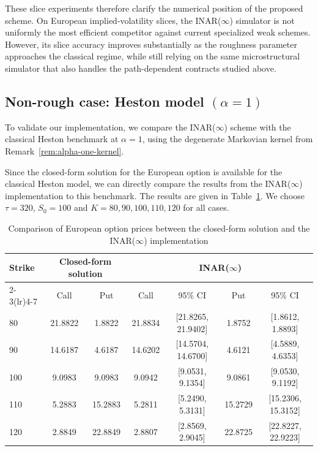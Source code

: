 \documentclass[letterpaper]{article}
\numberwithin{equation}{section}
\theoremstyle{definition}
\theoremstyle{remark}
\begin{document}
These slice experiments therefore clarify the numerical position of the proposed scheme. On European implied-volatility slices, the INAR($\infty$) simulator is not uniformly the most efficient competitor against current specialized weak schemes. However, its slice accuracy improves substantially as the roughness parameter approaches the classical regime, while still relying on the same microstructural simulator that also handles the path-dependent contracts studied above.


\subsection{Non-rough case: Heston model \texorpdfstring{$(\alpha=1)$}{(alpha=1)}}

To validate our implementation, we compare the INAR($\infty$) scheme with the classical Heston benchmark at $\alpha=1$, using the degenerate Markovian kernel from Remark~\ref{rem:alpha-one-kernel}.

Since the closed-form solution for the European option is available for the classical Heston model, we can directly compare the results from the INAR($\infty$) implementation to this benchmark. The results are given in Table~\ref{tab:european_comparison}. We choose $\tau=320$, $S_0=100$ and $K=80,90,100,110,120$ for all cases. 

\begin{table}[ht]
  \centering
  \caption{Comparison of European option prices between the closed-form solution and the INAR($\infty$) implementation}
  \small
  \setlength{\tabcolsep}{5pt}
  \begin{tabular*}{\textwidth}{@{\extracolsep{\fill}}lcccccc@{}}
  \toprule
  \multirow{2}{*}{Strike} & \multicolumn{2}{c}{Closed-form solution} & \multicolumn{4}{c}{%
  INAR($\infty$)} \\
  \cmidrule(lr){2-3}\cmidrule(lr){4-7}
   & Call & Put & Call & 95\% CI & Put & 95\% CI \\
  \midrule
  80  & 21.8822 & 1.8822 & 21.8834 & [21.8265, 21.9402] & 1.8752 & [1.8612, 1.8893] \\
  90  & 14.6187 & 4.6187 & 14.6202 & [14.5704, 14.6700] & 4.6121 & [4.5889, 4.6353] \\
  100 & 9.0983  & 9.0983  & 9.0942  & [9.0531, 9.1354]  & 9.0861  & [9.0530, 9.1192] \\
  110 & 5.2883  & 15.2883 & 5.2811  & [5.2490, 5.3131]  & 15.2729 & [15.2306, 15.3152] \\
  120 & 2.8849  & 22.8849 & 2.8807  & [2.8569, 2.9045]  & 22.8725 & [22.8227, 22.9223] \\
  \bottomrule
  \end{tabular*}
  \label{tab:european_comparison}
\end{table}
\end{document}
